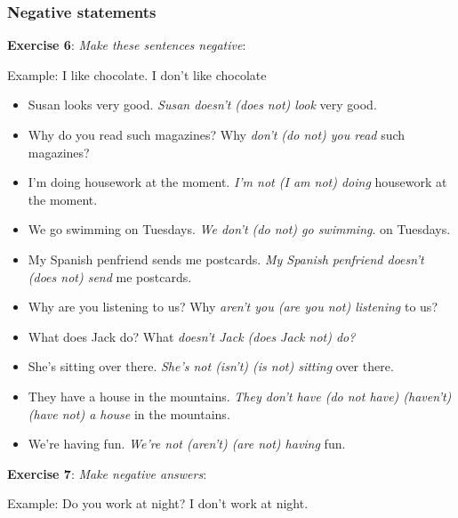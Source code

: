 \subsubsection{Negative statements}

\textbf{Exercise 6}: \textit{Make these sentences negative}:

Example: 
I like chocolate.
I don't like chocolate

\begin{itemize}

\item Susan looks very good. \textit{Susan doesn't (does not) look} very good.
\item Why do you read such magazines? Why \textit{don't (do not) you read} such magazines?
\item I'm doing housework at the moment. \textit{I'm not (I am not) doing} housework at the moment.
\item We go swimming on Tuesdays. \textit{We don't (do not) go swimming}. on Tuesdays.
\item My Spanish penfriend sends me postcards. \textit{My Spanish penfriend doesn't (does not) send} me postcards.
\item Why are you listening to us? Why \textit{aren't you (are you not) listening} to us?
\item What does Jack do? What \textit{doesn't Jack (does Jack not) do?}
\item She's sitting over there. \textit{She's not (isn't) (is not) sitting} over there.
\item They have a house in the mountains. \textit{They don't have (do not have) (haven't) (have not) a house} in the mountains.
\item We're having fun. \textit{We're not (aren't) (are not) having} fun.

\end{itemize}

\textbf{Exercise 7}: \textit{Make negative answers}:

Example: 
Do you work at night?
I don't work at night.

